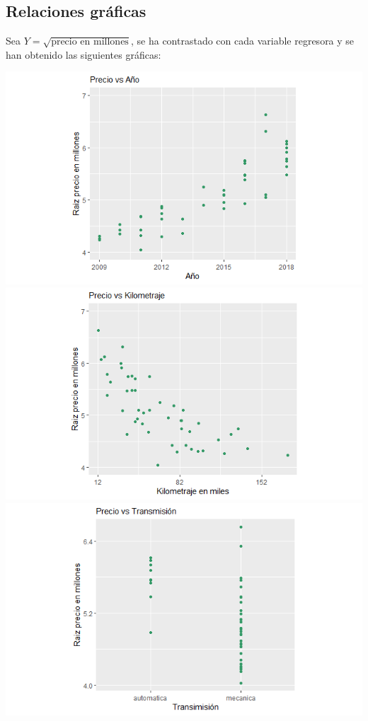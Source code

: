 \documentclass[12pt,a0,portrait]{a0poster}
\begin{document}
\begin{multicols}{2}
\section*{\textcolor{ginger}{\huge Relaciones gr\'aficas}}

Sea $Y=\sqrt{\text{precio\ en\ millones}}$, se ha contrastado con cada variable regresora y se han obtenido las siguientes gr\'aficas:
\begin{center}
	\includegraphics[scale=1]{PvsA}
	\includegraphics[scale=1]{PvsK}\\
	\includegraphics[scale=1]{PvsT}

\end{center}
\end{multicols}
\end{document}
